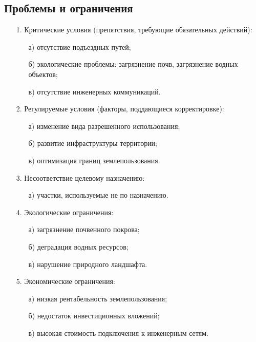 \subsection{Проблемы и ограничения}
\label{subsec:problem}

\begin{enumerate}
    \item[1.] Критические условия (препятствия, требующие обязательных действий):
    \begin{enumerate}
        \item[а)] отсутствие подъездных путей;
        \item[б)] экологические проблемы: загрязнение почв, загрязнение водных объектов;
        \item[в)] отсутствие инженерных коммуникаций.
    \end{enumerate}
    \item[2.] Регулируемые условия (факторы, поддающиеся корректировке):
    \begin{enumerate}
        \item[а)] изменение вида разрешенного использования;
        \item[б)] развитие инфраструктуры территории;
        \item[в)] оптимизация границ землепользования.
    \end{enumerate}
    \item[3.] Несоответствие целевому назначению:
    \begin{enumerate}
        \item[а)] участки, используемые не по назначению.
    \end{enumerate}
    \item[4.] Экологические ограничения:
    \begin{enumerate}
        \item[а)] загрязнение почвенного покрова;
        \item[б)] деградация водных ресурсов;
        \item[в)] нарушение природного ландшафта.
    \end{enumerate}
    \item[5.] Экономические ограничения:
    \begin{enumerate}
        \item[а)] низкая рентабельность землепользования;
        \item[б)] недостаток инвестиционных вложений;
        \item[в)] высокая стоимость подключения к инженерным сетям.

\end{enumerate}
\end{enumerate}
